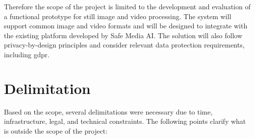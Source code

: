 Therefore the scope of the project is limited to the development and evaluation of a functional prototype for still image and video processing. The system will support common image and video formats and will be designed to integrate with the existing platform developed by Safe Media AI. The solution will also follow privacy-by-design principles and consider relevant data protection requirements, including \gls{gdpr}.


\section{Delimitation}

Based on the scope, several delimitations were necessary due to time, infrastructure, legal, and technical constraints. The following points clarify what is outside the scope of the project:

